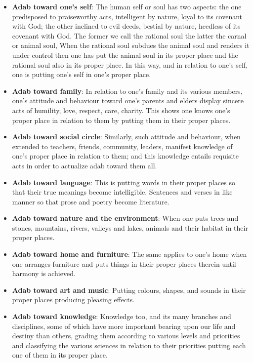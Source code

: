 \begin{itemize}


\item \textbf{Adab toward one's self}: The human self or soul has two aspects: the one predisposed to praiseworthy acts, intelligent by nature, loyal to its covenant with God; the other inclined to evil deeds, bestial by nature, heedless of its covenant with God. The former we call the rational soul the latter the carnal or animal soul, When the rational soul subdues the animal soul and renders it under control then one has put the animal soul in its proper place and the rational soul also in its proper place. In this way, and in relation to one's self, one is putting one's self in one's proper place.

\item \textbf{Adab toward family}: In relation to one's family and its various members, one's attitude and behaviour toward one's parents and elders display sincere acts of humility, love, respect, care, charity. This shows one knows one's proper place in relation to them by putting them in their proper places.

\item \textbf{Adab toward social circle}: Similarly, such attitude and behaviour, when extended to teachers, friends, community, leaders, manifest knowledge of one's proper place in relation to them; and this knowledge entails requisite acts in order to actualize adab toward them all.

\item \textbf{Adab toward language}: This is putting words in their proper places so that their true meanings become intelligible. Sentences and verses in like manner so that prose and poetry become literature.

\item \textbf{Adab toward nature and the environment}: When one puts trees and stones, mountains, rivers, valleys and lakes, animals and their habitat in their proper places.

\item \textbf{Adab toward home and furniture}: The same applies to one's home when one arranges furniture and puts things in their proper places therein until harmony is achieved.

\item \textbf{Adab toward art and music}: Putting colours, shapes, and sounds in their proper places producing pleasing effects.

\item \textbf{Adab toward knowledge}: Knowledge too, and its many branches and disciplines, some of which have more important bearing upon our life and destiny than others, grading them according to various levels and priorities and classifying the various sciences in relation to their priorities putting each one of them in its proper place.
\end{itemize}


